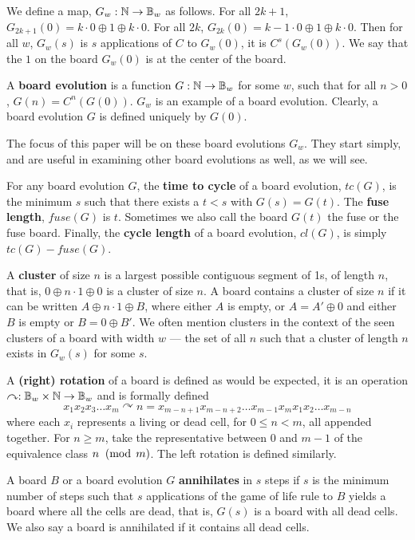 \documentclass[12pt,letterpaper]{article}
\begin{document}
\begin{dfn}\label{mainBoard1Center}
  We define a map, $G_w: \mathbb{N}\rightarrow \mathbb{B}_w$ as follows. For all $2k+1$, $G_{2k+1}(0) = k\cdot 0 \oplus 1 \oplus k\cdot 0$. For all $2k$, $G_{2k}(0) = k-1\cdot 0 \oplus 1 \oplus k\cdot 0$. Then for all $w$, $G_w(s)$ is $s$ applications of $C$ to $G_w(0)$, it is $C^s(G_w(0))$. We say that the $1$ on the board $G_w(0)$ is at the center of the board.
\end{dfn}
\begin{dfn} \label{BoardEvolution}
  A {\bf board evolution} is a function $G:\mathbb{N} \rightarrow \mathbb{B}_w$ for some $w$, such that for all $n>0$, $G(n)=C^n(G(0))$. $G_w$ is an example of a board evolution. Clearly, a board evolution $G$ is defined uniquely by $G(0)$.
\end{dfn}

The focus of this paper will be on these board evolutions $G_w$. They start simply, and are useful in examining other board evolutions as well, as we will see.

\begin{dfn}\label{cycles}
  For any board evolution $G$, the {\bf time to cycle} of a board evolution, $tc(G)$, is the minimum $s$ such that there exists a $t<s$ with $G(s)=G(t)$. The {\bf fuse length}, $fuse(G)$ is $t$. Sometimes we also call the board $G(t)$ the fuse or the fuse board. Finally, the {\bf cycle length} of a board evolution, $cl(G)$, is simply $tc(G)-fuse(G)$.
\end{dfn}
\begin{dfn}\label{cluster}
  A {\bf cluster} of size $n$ is a largest possible contiguous segment of 1s, of length $n$,  that is, $0\oplus n\cdot 1\oplus 0$ is a cluster of size $n$. A board contains a cluster of size $n$ if it can be written $A\oplus n\cdot 1\oplus B$, where either $A$ is empty, or $A=A'\oplus 0$ and either $B$ is empty or $B=0\oplus B'$. We often mention clusters in the context of the seen clusters of a board with width $w$ --- the set of all $n$ such that a cluster of length $n$ exists in $G_w(s)$ for some $s$. 
\end{dfn}
\begin{dfn}\label{rotation}
  A {\bf (right) rotation} of a board is defined as would be expected, it is an operation $\curvearrowright: \mathbb{B}_w\times \mathbb{N}\rightarrow \mathbb{B}_w$ and is formally defined $$x_1x_2x_3\dots x_m\curvearrowright n = x_{m-n+1}x_{m-n+2}\dots x_{m-1}x_mx_1x_2\dots x_{m-n}$$ where each $x_i$ represents a living or dead cell, for $0\leq n<m$, all appended together. For $n\geq m$, take the representative between $0$ and $m-1$ of the equivalence class $n\;\;(\operatorname{mod}\;m)$. The left rotation is defined similarly.
\end{dfn} %
\begin{dfn}\label{annihilation}
  A board $B$ or a board evolution $G$ {\bf annihilates} in $s$ steps if $s$ is the minimum number of steps such that $s$ applications of the game of life rule to $B$ yields a board where all the cells are dead, that is, $G(s)$ is a board with all dead cells. We also say a board is annihilated if it contains all dead cells.
\end{dfn}
\end{document}
